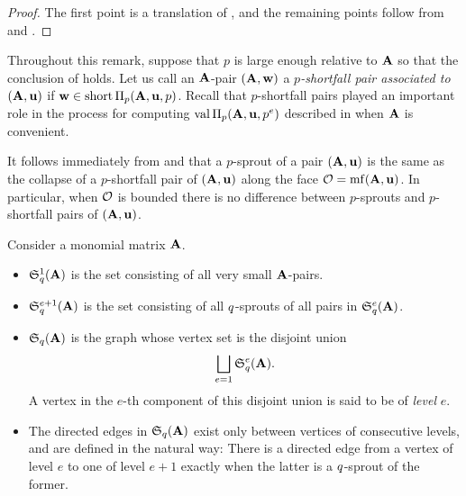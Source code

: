 \documentclass{amsart}
\begin{document}
\begin{proof} 
The first point is a translation of , and the remaining points follow from  and .
\end{proof}

\begin{remark}
   \label{sprouts as collapsed shortfall pairs: R}
   Throughout this remark, suppose that $p$ is large enough relative to $\mathbf{A}$ so that the conclusion of  holds.
   Let us call an $\mathbf{A}$-pair $(\mathbf{A},\mathbf{w})$ a \emph{$p$-shortfall pair associated to $(\mathbf{A},\mathbf{u})$} if $\mathbf{w} \in \operatorname{short} \Pi_p(\mathbf{A},\mathbf{u},p)$.   Recall that $p$-shortfall pairs played an important role in the process for computing $\operatorname{val} \Pi_p(\mathbf{A},\mathbf{u},p^e)$ described in  when $\mathbf{A}$ is convenient.

   It follows immediately from  and  that a $p$-sprout of a pair $(\mathbf{A},\mathbf{u})$ is the same as the collapse of a $p$-shortfall pair of $(\mathbf{A},\mathbf{u})$ along the face $\mathcal{O}=\operatorname{mf}(\mathbf{A},\mathbf{u})$.  In particular, when $\mathcal{O}$ is bounded there is no difference between $p$-sprouts and $p$-shortfall pairs of $(\mathbf{A},\mathbf{u})$.
\end{remark}

\begin{definition}
   Consider a monomial matrix $\mathbf{A}$.
   
   \begin{itemize}
   \item $\mathfrak{S}_{q}^1(\mathbf{A})$ is the set consisting of all very small $\mathbf{A}$-pairs.
   \item $\mathfrak{S}_{q}^{e+1}(\mathbf{A})$ is the set consisting of all $q$-sprouts of all pairs in $\mathfrak{S}_{q}^e(\mathbf{A})$.
   \item $\mathfrak{S}_{q}(\mathbf{A})$ is the graph whose vertex set is the disjoint union
   \[ \bigsqcup_{e=1} \mathfrak{S}_{q}^e(\mathbf{A}). \]
   A vertex in the $e$-th component of this disjoint union is said to be of \emph{level} $e$.
   \item    The directed edges in $\mathfrak{S}_{q}(\mathbf{A})$ exist only between vertices of consecutive levels, and are defined in the natural way:  There is a directed edge from a vertex of level $e$ to one of level $e+1$ exactly when the latter is a $q$-sprout of the former.
\end{itemize}
\end{definition}
\end{document}

